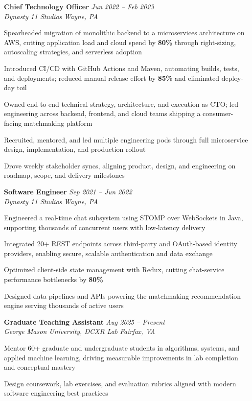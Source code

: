 \documentclass[letterpaper,10pt]{article}
\newcommand{\role}[4]{%
  \textbf{#1} \hfill \textit{#3}\\[-1pt]
  \textit{#2} \hfill \textit{#4}\par\vspace{2pt}
}
\begin{document}
\role{Chief Technology Officer}{Dynasty 11 Studios}{Jun 2022 -- Feb 2023}{Wayne, PA}
\begin{tightitemize}
  \item Spearheaded migration of monolithic backend to a microservices architecture on AWS, cutting application load and cloud spend by \textbf{80\%} through right-sizing, autoscaling strategies, and serverless adoption
  \item Introduced CI/CD with GitHub Actions and Maven, automating builds, tests, and deployments; reduced manual release effort by \textbf{85\%} and eliminated deploy-day toil
  \item Owned end-to-end technical strategy, architecture, and execution as CTO; led engineering across backend, frontend, and cloud teams shipping a consumer-facing matchmaking platform
  \item Recruited, mentored, and led multiple engineering pods through full microservice design, implementation, and production rollout
  \item Drove weekly stakeholder syncs, aligning product, design, and engineering on roadmap, scope, and delivery milestones
\end{tightitemize}

\role{Software Engineer}{Dynasty 11 Studios}{Sep 2021 -- Jun 2022}{Wayne, PA}
\begin{tightitemize}
  \item Engineered a real-time chat subsystem using STOMP over WebSockets in Java, supporting thousands of concurrent users with low-latency delivery
  \item Integrated 20+ REST endpoints across third-party and OAuth-based identity providers, enabling secure, scalable authentication and data exchange
  \item Optimized client-side state management with Redux, cutting chat-service performance bottlenecks by \textbf{80\%}
  \item Designed data pipelines and APIs powering the matchmaking recommendation engine serving thousands of active users
\end{tightitemize}

\role{Graduate Teaching Assistant}{George Mason University, DCXR Lab}{Aug 2025 -- Present}{Fairfax, VA}
\begin{tightitemize}
  \item Mentor 60+ graduate and undergraduate students in algorithms, systems, and applied machine learning, driving measurable improvements in lab completion and conceptual mastery
  \item Design coursework, lab exercises, and evaluation rubrics aligned with modern software engineering best practices
\end{tightitemize}
\end{document}
